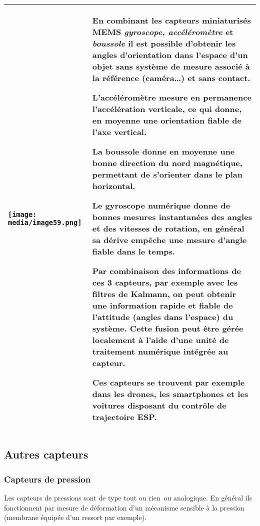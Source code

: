 \documentclass[
]{article}
\begin{document}
\begin{longtable}[]{@{}
  >{\raggedright\arraybackslash}p{}
  >{\raggedright\arraybackslash}p{}@{}}
\toprule
\endhead
\texttt{[image: media/image59.png]} &
En combinant les capteurs miniaturisés MEMS \emph{gyroscope,
accéléromètre} et \emph{boussole} il est possible d'obtenir les angles
d'orientation dans l'espace d'un objet sans système de mesure associé à
la référence (caméra\ldots) et sans contact.

L'accéléromètre mesure en permanence l'accélération verticale, ce qui
donne, en moyenne une orientation fiable de l'axe vertical.

La boussole donne en moyenne une bonne direction du nord magnétique,
permettant de s'orienter dans le plan horizontal.

Le gyroscope numérique donne de bonnes mesures instantanées des angles
et des vitesses de rotation, en général sa dérive empêche une mesure
d'angle fiable dans le temps.

Par combinaison des informations de ces 3 capteurs, par exemple avec les
filtres de Kalmann, on peut obtenir une information rapide et fiable de
l'attitude (angles dans l'espace) du système. Cette fusion peut être
gérée localement à l'aide d'une unité de traitement numérique intégrée
au capteur.

Ces capteurs se trouvent par exemple dans les \textbf{drones}, les
\textbf{smartphones} et les voitures disposant du contrôle de
trajectoire ESP. \\
\bottomrule
\end{longtable}

\hypertarget{autres-capteurs}{%
\subsection{Autres capteurs}\label{autres-capteurs}}

\hypertarget{capteurs-de-pression}{%
\subsubsection{Capteurs de pression}\label{capteurs-de-pression}}

Les capteurs de pressions sont de type tout ou rien~ou analogique. En
général ils fonctionnent par mesure de déformation d'un mécanisme
sensible à la pression (membrane équipée d'un ressort par exemple).
\end{document}
